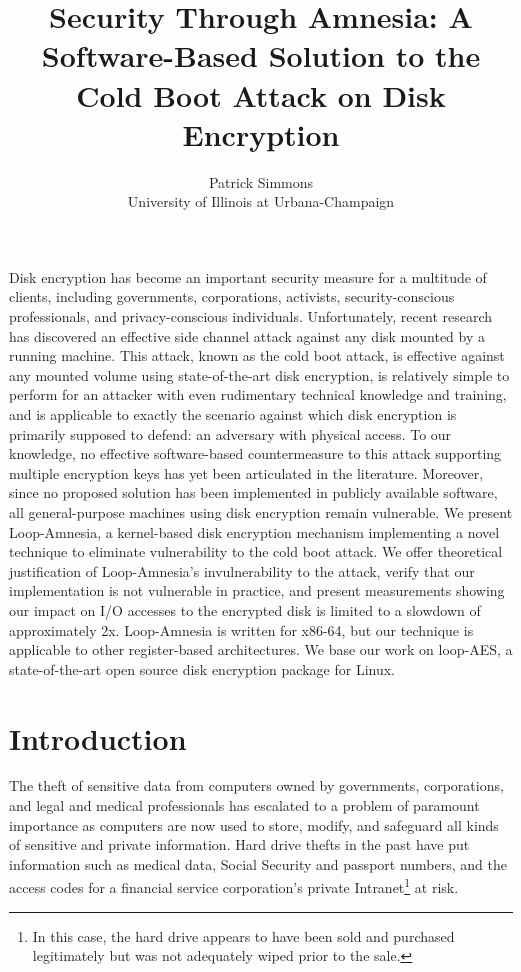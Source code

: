 \documentclass[letterpaper,twocolumn,nonatbib,10pt]{article}
\begin{document}
\fontsize{10}{12.03}
\selectfont

\title{Security Through Amnesia: A Software-Based Solution to the
  Cold Boot Attack on Disk Encryption}

\author{
{\rm Patrick Simmons}\\
University of Illinois at Urbana-Champaign
} 

\maketitle




\abstract Disk encryption has become an important security measure for
a multitude of clients, including governments, corporations,
activists, security-conscious professionals, and privacy-conscious
individuals.  Unfortunately, recent research has discovered an
effective side channel attack against any disk mounted by a running
machine\cite{princetonattack}.  This attack, known as the cold boot
attack, is effective against any mounted volume using state-of-the-art
disk encryption, is relatively simple to perform for an attacker with
even rudimentary technical knowledge and training, and is applicable
to exactly the scenario against which disk encryption is primarily
supposed to defend: an adversary with physical access.  To our
knowledge, no effective software-based countermeasure to this attack
supporting multiple encryption keys has yet been articulated in the
literature.  Moreover, since no proposed solution has been implemented
in publicly available software, all general-purpose machines using
disk encryption remain vulnerable.  We present Loop-Amnesia, a
kernel-based disk encryption mechanism implementing a novel technique
to eliminate vulnerability to the cold boot attack.  We offer
theoretical justification of Loop-Amnesia's invulnerability to the
attack, verify that our implementation is not vulnerable in practice,
and present measurements showing our impact on I/O accesses to the
encrypted disk is limited to a slowdown of approximately 2x.
Loop-Amnesia is written for x86-64, but our technique is applicable to
other register-based architectures.  We base our work on loop-AES, a
state-of-the-art open source disk encryption package for Linux.
\endabstract

\section{Introduction}

The theft of sensitive data from computers owned by governments,
corporations, and legal and medical professionals has escalated to a
problem of paramount importance as computers are now used to store,
modify, and safeguard all kinds of sensitive and private information.
Hard drive thefts in the past have put information such as medical
data\cite{dumbdoc}, Social Security and passport
numbers\cite{wackenhut}, and the access codes for a financial service
corporation's private Intranet\cite{bbcscary}\footnote{In this case,
  the hard drive appears to have been sold and purchased legitimately
  but was not adequately wiped prior to the sale.} at risk.
\end{document}
